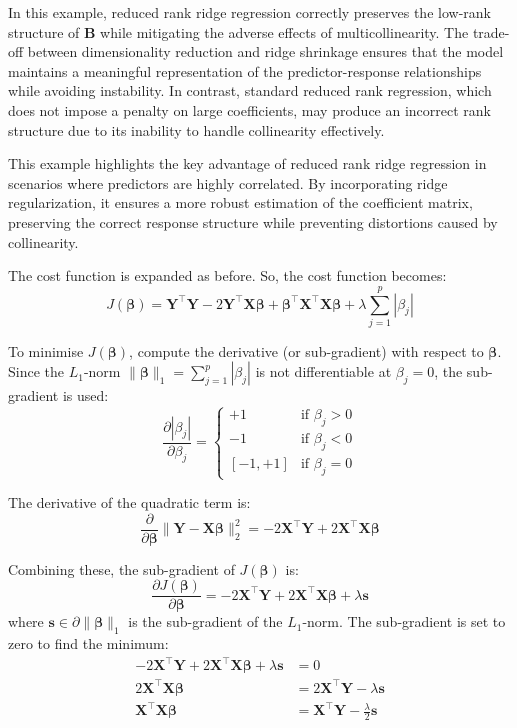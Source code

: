 In this example, reduced rank ridge regression correctly preserves the low-rank structure of \( \mathbf{B} \) while mitigating the adverse effects of multicollinearity. The trade-off between dimensionality reduction and ridge shrinkage ensures that the model maintains a meaningful representation of the predictor-response relationships while avoiding instability. In contrast, standard reduced rank regression, which does not impose a penalty on large coefficients, may produce an incorrect rank structure due to its inability to handle collinearity effectively.  

This example highlights the key advantage of reduced rank ridge regression in scenarios where predictors are highly correlated. By incorporating ridge regularization, it ensures a more robust estimation of the coefficient matrix, preserving the correct response structure while preventing distortions caused by collinearity.


 The cost function is expanded as before. So, the cost function becomes:
\[
J(\boldsymbol{\beta}) = \mathbf{Y}^\top \mathbf{Y} - 2 \mathbf{Y}^\top \mathbf{X} \boldsymbol{\beta} + \boldsymbol{\beta}^\top \mathbf{X}^\top \mathbf{X} \boldsymbol{\beta} + \lambda \sum_{j=1}^p |\beta_j|
\]

\noindent To minimise \(J(\boldsymbol{\beta})\), compute the derivative (or sub-gradient) with respect to \(\boldsymbol{\beta}\). Since the \(L_1\)-norm \(\|\boldsymbol{\beta}\|_1 = \sum_{j=1}^p |\beta_j|\) is not differentiable at \(\beta_j = 0\), the sub-gradient is used:
\[
\frac{\partial |\beta_j|}{\partial \beta_j} =
\begin{cases}
+1 & \text{if } \beta_j > 0 \\
-1 & \text{if } \beta_j < 0 \\
[-1, +1] & \text{if } \beta_j = 0
\end{cases}
\]

\noindent The derivative of the quadratic term is:
\[
\frac{\partial}{\partial \boldsymbol{\beta}} \|\mathbf{Y} - \mathbf{X}\boldsymbol{\beta}\|_2^2 = -2 \mathbf{X}^\top \mathbf{Y} + 2 \mathbf{X}^\top \mathbf{X} \boldsymbol{\beta}
\]

\noindent Combining these, the sub-gradient of \(J(\boldsymbol{\beta})\) is:
\[
\frac{\partial J(\boldsymbol{\beta})}{\partial \boldsymbol{\beta}} = -2 \mathbf{X}^\top \mathbf{Y} + 2 \mathbf{X}^\top \mathbf{X} \boldsymbol{\beta} + \lambda \mathbf{s}
\]
where \(\mathbf{s} \in \partial \|\boldsymbol{\beta}\|_1\) is the sub-gradient of the \(L_1\)-norm. The sub-gradient is set to zero to find the minimum:
\begin{align*}
-2 \mathbf{X}^\top \mathbf{Y} + 2 \mathbf{X}^\top \mathbf{X} \boldsymbol{\beta} + \lambda \mathbf{s} &= 0 \\
2 \mathbf{X}^\top \mathbf{X} \boldsymbol{\beta} &= 2 \mathbf{X}^\top \mathbf{Y} - \lambda \mathbf{s} \\
\mathbf{X}^\top \mathbf{X} \boldsymbol{\beta} &= \mathbf{X}^\top \mathbf{Y} - \frac{\lambda}{2} \mathbf{s}
\end{align*}


